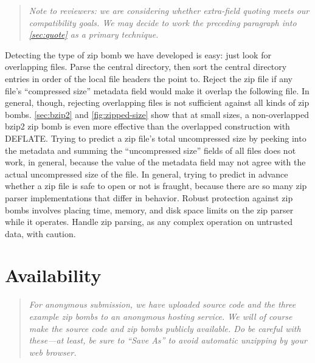 \documentclass[letterpaper,twocolumn,10pt]{article}
\begin{document}
\begin{quote}
\sl
Note to reviewers:
we are considering whether extra-field quoting meets
our compatibility goals.
We may decide to work the preceding paragraph
into \autoref{sec:quote} as a primary technique.
\end{quote}

Detecting the type of zip bomb we have developed is easy:
just look for overlapping files.
Parse the central directory,
then sort the central directory entries
in order of the local file headers the point to.
Reject the zip file if any file's ``compressed size''
metadata field would make it overlap the following file.
In general, though, rejecting overlapping files is not sufficient against all kinds of zip bombs.
\autoref{sec:bzip2} and \autoref{fig:zipped-size}
show that at small sizes, a non-overlapped bzip2 zip bomb
is even more effective than
the overlapped construction with DEFLATE.
Trying to predict a zip file's total uncompressed size
by peeking into the metadata and summing
the ``uncompressed size'' fields of all files
does not work, in general,
because the value of the metadata field
may not agree with the actual uncompressed size of the file.
In general, trying to predict in advance whether a zip file
is safe to open or not is fraught,
because there are so many zip parser implementations
that differ in behavior.
Robust protection against zip bombs
involves placing time, memory, and disk space limits
on the zip parser while it operates.
Handle zip parsing,
as any complex operation on untrusted data,
with caution.




\section*{Availability}

\begin{quote}
\sl
For anonymous submission,
we have uploaded source code
and the three example zip bombs
to an anonymous hosting service.
We will of course make the source code
and zip bombs publicly available.
Do be careful with these---at least,
be sure to ``Save As''
to avoid automatic unzipping by your web browser.
\end{quote}
\end{document}
